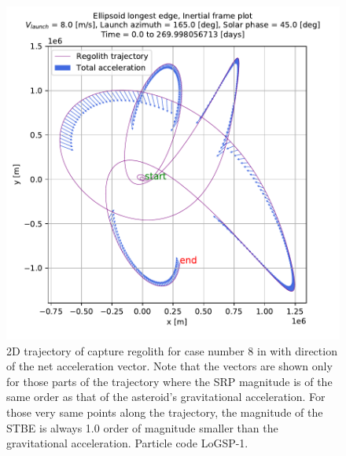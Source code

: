 \FloatBarrier
\begin{figure}[htb]
\centering
\captionsetup{justification=centering}
\includegraphics[width=\linewidth, height=0.45\textheight, keepaspectratio=true]{longest_edge_perturbations/3.2Density_1cmSize/8ms_165Azimuth_45SolarPhase/netAcceleration_vectors.pdf}
\caption{2D trajectory of capture regolith for case number 8 in  with direction of the net acceleration vector. Note that the vectors are shown only for those parts of the trajectory where the \gls{SRP} magnitude is of the same order as that of the asteroid's gravitational acceleration. For those very same points along the trajectory, the magnitude of the \gls{STBE} is always 1.0 order of magnitude smaller than the gravitational acceleration. Particle code LoGSP-1.}
\label{fig:LoGSP_1_capture_case_8_2d_totalAccelerationVector}
\end{figure}
\FloatBarrier
